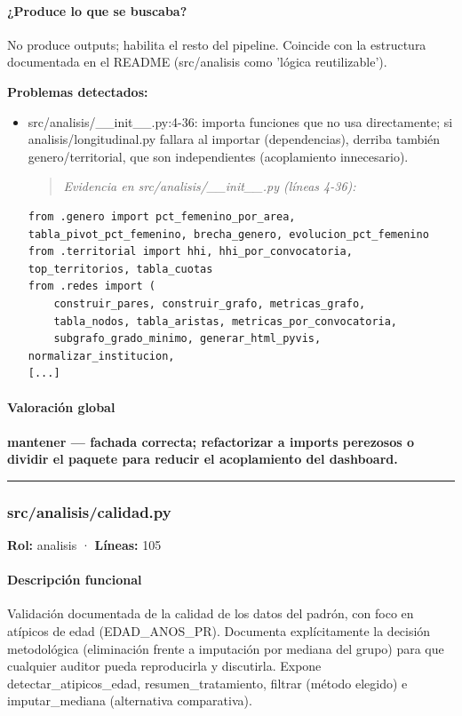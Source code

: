 \paragraph{¿Produce lo que se buscaba?}
No produce outputs; habilita el resto del pipeline. Coincide con la estructura documentada en el README (src/analisis como 'lógica reutilizable').

\begin{tcolorbox}[riesgo]
\textbf{Problemas detectados:}
\begin{itemize}
  \item src/analisis/\_\_init\_\_.py:4-36: importa funciones que no usa directamente; si analisis/longitudinal.py fallara al importar (dependencias), derriba también genero/territorial, que son independientes (acoplamiento innecesario).
\begin{quote}\footnotesize\ttfamily
\noindent\emph{Evidencia en src/analisis/\_\_init\_\_.py (líneas 4-36):}
\end{quote}
\begin{lstlisting}
from .genero import pct_femenino_por_area, tabla_pivot_pct_femenino, brecha_genero, evolucion_pct_femenino
from .territorial import hhi, hhi_por_convocatoria, top_territorios, tabla_cuotas
from .redes import (
    construir_pares, construir_grafo, metricas_grafo,
    tabla_nodos, tabla_aristas, metricas_por_convocatoria,
    subgrafo_grado_minimo, generar_html_pyvis, normalizar_institucion,
[...]
\end{lstlisting}

\end{itemize}
\end{tcolorbox}

\paragraph{Valoración global}
\textbf{mantener --- fachada correcta; refactorizar a imports perezosos o dividir el paquete para reducir el acoplamiento del dashboard.}

\medskip
\hrule

\subsubsection{src/analisis/calidad.py}
\textbf{Rol:} analisis · \textbf{Líneas:} 105

\paragraph{Descripción funcional}
Validación documentada de la calidad de los datos del padrón, con foco en atípicos de edad (EDAD\_ANOS\_PR). Documenta explícitamente la decisión metodológica (eliminación frente a imputación por mediana del grupo) para que cualquier auditor pueda reproducirla y discutirla. Expone detectar\_atipicos\_edad, resumen\_tratamiento, filtrar (método elegido) e imputar\_mediana (alternativa comparativa).

